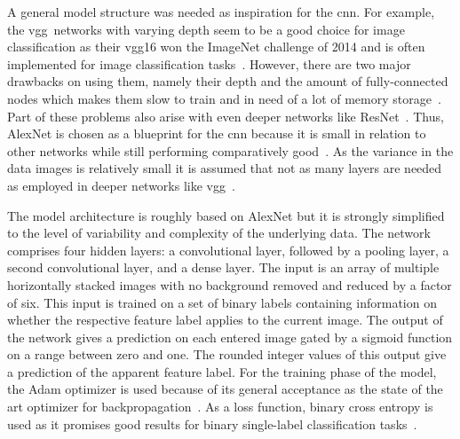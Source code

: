 \bigskip
A general model structure was needed as inspiration for the \acrshort{cnn}. For example, the \acrfull{vgg}~networks with varying depth seem to be a good choice for image classification as their \acrshort{vgg}16 won the ImageNet challenge of 2014 and is often implemented for image classification tasks~\citep{hassan2018vgg,vgg2014original}. However, there are two major drawbacks on using them, namely their depth and the amount of fully-connected nodes which makes them slow to train and in need of a lot of memory storage~\citep{hassan2018vgg,zhang2015accelerating}. Part of these problems also arise with even deeper networks like ResNet~\citep{resnet2016original,hassan2019resnet}. Thus, AlexNet is chosen as a blueprint for the \acrshort{cnn} because it is small in relation to other networks while still performing comparatively good~\citep{hassan2019alexnet,alexnet2012original,geron2019hands}. As the variance in the data images is relatively small it is assumed that not as many layers are needed as employed in deeper networks like \acrshort{vgg}~\citep{geron2019hands}.
 
\bigskip
The model architecture is roughly based on AlexNet but it is strongly simplified to the level of variability and complexity of the underlying data. The network comprises four hidden layers: a convolutional layer, followed by a pooling layer, a second convolutional layer, and a dense layer. The input is an array of multiple horizontally stacked images with no background removed and reduced by a factor of six. This input is trained on a set of binary labels containing information on whether the respective feature label applies to the current image. The output of the network gives a prediction on each entered image gated by a sigmoid function on a range between zero and one. The rounded integer values of this output give a prediction of the apparent feature label.
For the training phase of the model, the Adam optimizer is used because of its general acceptance as the state of the art optimizer for backpropagation~\citep{bushaev2018adam,kingma2014adam}. As a loss function, binary cross entropy is used as it promises good results for binary single-label classification tasks~\citep{geron2019hands,godoy2018understanding,dertat2017applied}.
 
